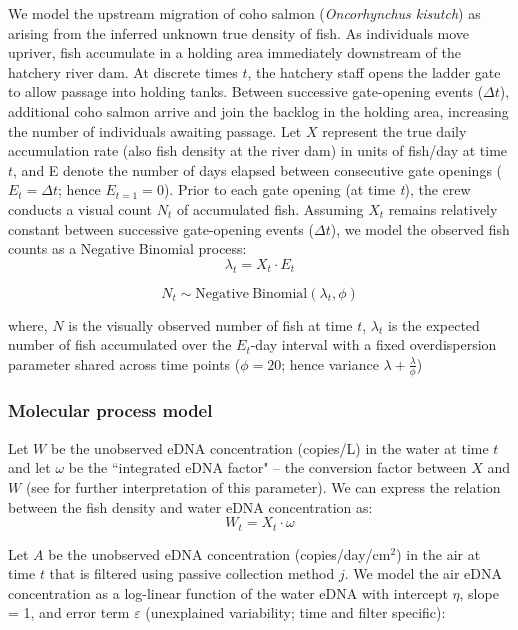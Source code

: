 \documentclass{article}
\begin{document}
We model the upstream migration of coho salmon (\textit{Oncorhynchus kisutch}) as arising from the inferred unknown true density of fish. As individuals move upriver, fish accumulate in a holding area immediately downstream of the hatchery river dam. At discrete times $t$, the hatchery staff opens the ladder gate to allow passage into holding tanks. Between successive gate-opening events ($\Delta t$), additional coho salmon arrive and join the backlog in the holding area, increasing the number of individuals awaiting passage. Let $X$ represent the true daily accumulation rate (also fish density at the river dam) in units of fish/day at time $t$, and E denote the number of days elapsed between consecutive gate openings ($ E_t =\Delta t$; hence $ E_{t=1} = 0$). Prior to each gate opening (at time \textit{t}), the crew conducts a visual count $N_t$ of accumulated fish. Assuming $X_t$ remains relatively constant between successive gate-opening events ($\Delta t$), we model the observed fish counts as a Negative Binomial process:
\begin{equation}
\lambda_t = X_t \cdot E_t
\end{equation}

\begin{equation}
N_t \sim \mathrm{Negative\ Binomial}(\lambda_t, \phi)
\end{equation} 

where, $N$ is the visually observed number of fish at time $t$,  $\lambda_t$ is the expected number of fish accumulated over the $E_t$-day interval with a fixed overdispersion parameter shared across time points ($\phi =20$; hence variance $\lambda+\frac{\lambda}{\phi}$) \cite{welch1993,guri2024a}

\subsubsection{Molecular process model}
Let $W$ be the unobserved eDNA concentration (copies/L) in the water at time $t$ and let $\omega$ be the ``integrated eDNA factor" -- the conversion factor between $X$ and $W$ (see \cite{guri2024a} for further interpretation of this parameter). We can express the relation between the fish density and water eDNA concentration as:
\begin{equation}
W_{t} = X_{t} \cdot \omega
\end{equation}

Let $A$ be the unobserved eDNA concentration (copies/day/cm$^2$) in the air at time $t$ that is filtered using passive collection method $j$. We model the air eDNA concentration as a log-linear function of the water eDNA with intercept $\eta$, slope = 1, and error term $\varepsilon$ (unexplained variability; time and filter specific):
\end{document}
